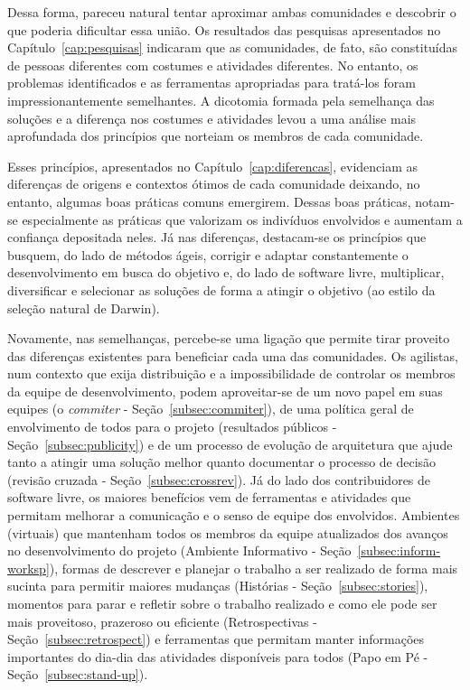 Dessa forma, pareceu natural tentar aproximar ambas comunidades e
descobrir o que poderia dificultar essa união. Os resultados das
pesquisas apresentados no Capítulo~\ref{cap:pesquisas} indicaram que
as comunidades, de fato, são constituídas de pessoas diferentes com
costumes e atividades diferentes. No entanto, os problemas
identificados e as ferramentas apropriadas para tratá-los foram
impressionantemente semelhantes.  A dicotomia formada pela semelhança
das soluções e a diferença nos costumes e atividades levou a uma
análise mais aprofundada dos princípios que norteiam os membros de
cada comunidade.

Esses princípios, apresentados no Capítulo~\ref{cap:diferencas},
evidenciam as diferenças de origens e contextos ótimos de cada
comunidade deixando, no entanto, algumas boas práticas comuns
emergirem. Dessas boas práticas, notam-se especialmente as práticas
que valorizam os indivíduos envolvidos e aumentam a confiança
depositada neles. Já nas diferenças, destacam-se os princípios que
busquem, do lado de métodos ágeis, corrigir e adaptar constantemente o
desenvolvimento em busca do objetivo e, do lado de software livre,
multiplicar, diversificar e selecionar as soluções de forma a atingir
o objetivo (ao estilo da seleção natural de Darwin).

Novamente, nas semelhanças, percebe-se uma ligação que permite tirar
proveito das diferenças existentes para beneficiar cada uma das
comunidades. Os agilistas, num contexto que exija distribuição e a
impossibilidade de controlar os membros da equipe de desenvolvimento,
podem aproveitar-se de um novo papel em suas equipes (o
\emph{commiter} - Seção~\ref{subsec:commiter}), de uma política geral
de envolvimento de todos para o projeto (resultados públicos -
Seção~\ref{subsec:publicity}) e de um processo de evolução de
arquitetura que ajude tanto a atingir uma solução melhor quanto
documentar o processo de decisão (revisão cruzada -
Seção~\ref{subsec:crossrev}).  Já do lado dos contribuidores de
software livre, os maiores benefícios vem de ferramentas e atividades
que permitam melhorar a comunicação e o senso de equipe dos
envolvidos. Ambientes (virtuais) que mantenham todos os membros da
equipe atualizados dos avanços no desenvolvimento do projeto (Ambiente
Informativo - Seção~\ref{subsec:inform-worksp}), formas de descrever e
planejar o trabalho a ser realizado de forma mais sucinta para
permitir maiores mudanças (Histórias - Seção~\ref{subsec:stories}),
momentos para parar e refletir sobre o trabalho realizado e como ele
pode ser mais proveitoso, prazeroso ou eficiente (Retrospectivas -
Seção~\ref{subsec:retrospect}) e ferramentas que permitam manter
informações importantes do dia-dia das atividades disponíveis para
todos (Papo em Pé - Seção~\ref{subsec:stand-up}).

